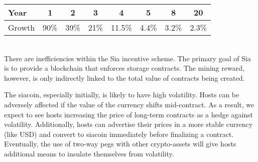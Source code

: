 \documentclass[twocolumn]{article}
\begin{document}
\tabcolsep=0.11cm \noindent
\begin{tabular}{ l | *{7}{c} }
	Year   &   1  &  2   &   3  &   4    &   5   &  8    & 20    \\ \hline
	Growth & 90\% & 39\% & 21\% & 11.5\% & 4.4\% & 3.2\% & 2.3\%
\end{tabular} \\

There are inefficiencies within the Sia incentive scheme.
The primary goal of Sia is to provide a blockchain that enforces storage contracts.
The mining reward, however, is only indirectly linked to the total value of contracts being created.

The siacoin, especially initially, is likely to have high volatility.
Hosts can be adversely affected if the value of the currency shifts mid-contract.
As a result, we expect to see hosts increasing the price of long-term contracts as a hedge against volatility.
Additionally, hosts can advertise their prices in a more stable currency (like USD) and convert to siacoin immediately before finalizing a contract.
Eventually, the use of two-way pegs with other crypto-assets will give hosts additional means to insulate themselves from volatility.




\end{document}
